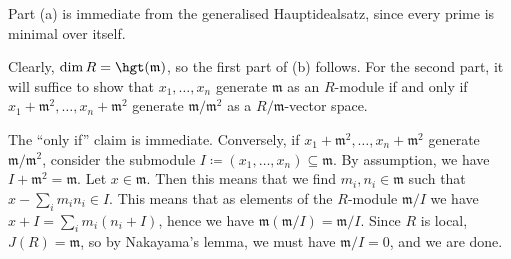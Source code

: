 Part (a) is immediate from the generalised Hauptidealsatz, since every
prime is minimal over itself.

Clearly, $\dim R = \hgt(\mathfrak{m})$, so the first part of (b) follows.
For the second part, it will suffice to show that $x_1, \ldots, x_n$ generate
$\mathfrak{m}$ as an $R$-module if and only if $x_1 + \mathfrak{m}^2, \ldots, x_n + \mathfrak{m}^2$
generate $\mathfrak{m}/\mathfrak{m}^2$ as a $R/\mathfrak{m}$-vector space.

The \enquote{only if} claim is immediate. Conversely, if
$x_1 + \mathfrak{m}^2, \ldots, x_n + \mathfrak{m}^2$ generate $\mathfrak{m}/\mathfrak{m}^2$,
consider the submodule $I \coloneqq (x_1, \ldots, x_n) \subseteq \mathfrak{m}$.
By assumption, we have $I + \mathfrak{m}^2 = \mathfrak{m}$.
Let $x \in \mathfrak{m}$. Then this means that we find $m_i, n_i \in \mathfrak{m}$
such that $x - \sum_i m_in_i \in I$. This means that as elements of the $R$-module
$\mathfrak{m}/I$ we have $x + I = \sum_i m_i(n_i + I)$, hence we have
 $\mathfrak{m}(\mathfrak{m}/I) = \mathfrak{m}/I$. Since $R$ is local,
 $J(R) = \mathfrak{m}$, so by Nakayama's lemma, we must have
 $\mathfrak{m}/I = 0$, and we are done.
